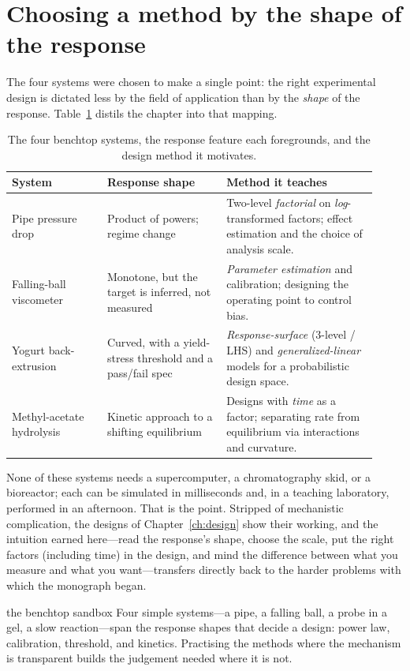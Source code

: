 \section{Choosing a method by the shape of the response}
\label{sec:bt-choosing}

The four systems were chosen to make a single point: the right experimental
design is dictated less by the field of application than by the \emph{shape} of
the response. Table~\ref{tab:bt-summary} distils the chapter into that mapping.

\begin{table}[t]
\centering
\caption[Benchtop systems and the methods they teach]{The four benchtop systems,
the response feature each foregrounds, and the design method it motivates.}
\label{tab:bt-summary}
\small
\begin{tabular}{@{}p{0.24\linewidth}p{0.30\linewidth}p{0.38\linewidth}@{}}
\toprule
\textbf{System} & \textbf{Response shape} & \textbf{Method it teaches} \\
\midrule
Pipe pressure drop & Product of powers; regime change &
Two-level \emph{factorial} on \emph{log}-transformed factors; effect estimation
and the choice of analysis scale. \\
Falling-ball viscometer & Monotone, but the target is inferred, not measured &
\emph{Parameter estimation} and calibration; designing the operating point to
control bias. \\
Yogurt back-extrusion & Curved, with a yield-stress threshold and a pass/fail spec &
\emph{Response-surface} (3-level / LHS) and \emph{generalized-linear} models for a
probabilistic design space. \\
Methyl-acetate hydrolysis & Kinetic approach to a shifting equilibrium &
Designs with \emph{time} as a factor; separating rate from equilibrium via
interactions and curvature. \\
\bottomrule
\end{tabular}
\end{table}

None of these systems needs a supercomputer, a chromatography skid, or a
bioreactor; each can be simulated in milliseconds and, in a teaching laboratory,
performed in an afternoon. That is the point. Stripped of mechanistic
complication, the designs of Chapter~\ref{ch:design} show their working, and the
intuition earned here---read the response's shape, choose the scale, put the
right factors (including time) in the design, and mind the difference between what
you measure and what you want---transfers directly back to the harder problems
with which the monograph began.

\begin{keybox}{the benchtop sandbox}
Four simple systems---a pipe, a falling ball, a probe in a gel, a slow
reaction---span the response shapes that decide a design: power law, calibration,
threshold, and kinetics. Practising the methods where the mechanism is
transparent builds the judgement needed where it is not.
\end{keybox}
